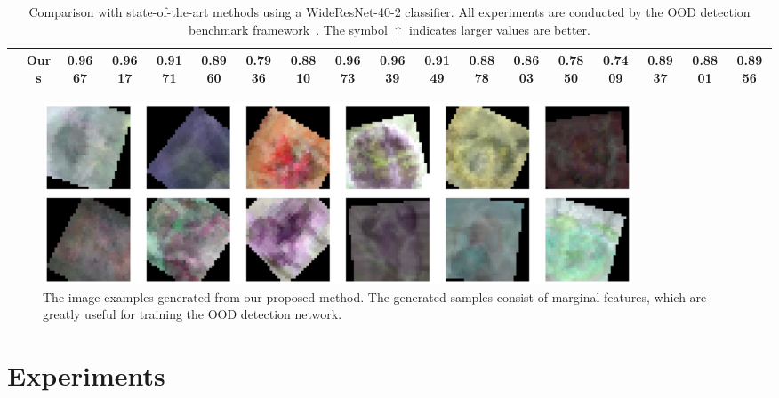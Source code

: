 \documentclass[letterpaper]{article} %
\begin{document}
\begin{table}[!ht]
\begin{adjustbox}{width=17.8cm,center}
\begin{tabular}{c|c|cccccccccccccc|cc}
  \cline{2-18}
 & Ours &\textbf{0.9667}&\textbf{0.9617}&0.9171	&0.8960	&0.7936	&0.8810	&0.9673	&0.9639	&0.9149	&0.8878	&0.8603	&0.7850&0.7409	&0.8937	&\textbf{0.8801}&\textbf{0.8956}\\
 \bottomrule
\end{tabular}
\end{adjustbox}
\caption{Comparison with state-of-the-art methods using a WideResNet-40-2 classifier. All experiments are conducted by the OOD detection benchmark framework~\cite{kirchheim2022pytorch}. The symbol $\uparrow$ indicates larger values are better.}
\label{tab:cifar10_table}
\end{table}
\begin{figure}[h]
    \centering \centerline{\includegraphics[width=0.85\textwidth]{figures/mixup_augmentation.png}}
    \caption{The image examples generated from our proposed method. The generated samples consist of marginal features, which are greatly useful for training the OOD detection network.}
    \label{fig:mixup_augmentation}
\end{figure}


\section{Experiments}
\end{document}
